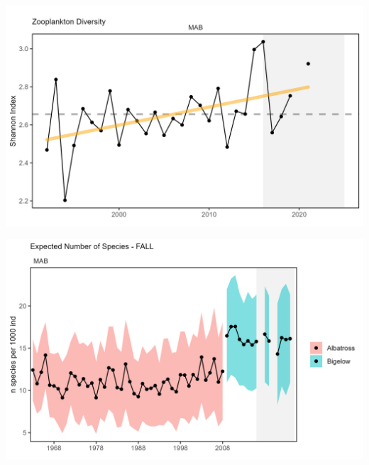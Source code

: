 \documentclass[
  10pt,
]{article}
\let\origfigure\figure
\let\endorigfigure\endfigure
\renewenvironment{figure}[1][2] {
    \expandafter\origfigure\expandafter[H]
} {
    \endorigfigure
}
\begin{document}
\begin{figure}

{\centering \includegraphics[width=6.5in]{images/MidAtlantic/zoo_diversity_MidAtlantic_2025-09-05} 

}

\caption{Zooplankton diversity in the Mid-Atlantic Bight, Shannon diversity index (black) with significant increase (orange line).}\label{fig:zoo-diversity}
\end{figure}

\begin{figure}

{\centering \includegraphics[width=6.5in]{images/MidAtlantic/exp_n_MidAtlantic_2025-09-05} 

}

\caption{Adult fish diversity in the Mid-Atlantic Bight, based on expected number of species. Results from survey vessels Albatross and Bigelow are reported separately due to catchability differences.}\label{fig:exp-n}
\end{figure}
\end{document}
